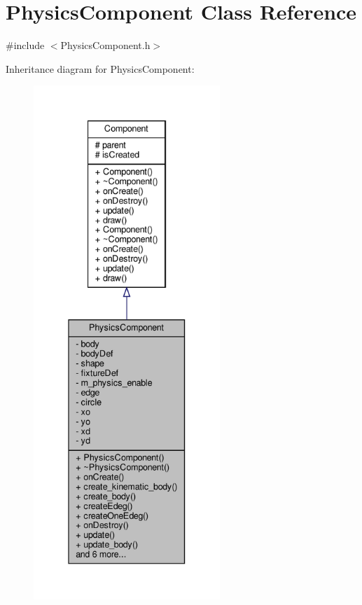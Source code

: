 \hypertarget{classPhysicsComponent}{}\section{Physics\+Component Class Reference}
\label{classPhysicsComponent}


{\ttfamily \#include $<$Physics\+Component.\+h$>$}



Inheritance diagram for Physics\+Component\+:
\nopagebreak
\begin{figure}[H]
\begin{center}
\leavevmode
\includegraphics[height=550pt]{classPhysicsComponent__inherit__graph}
\end{center}
\end{figure}


